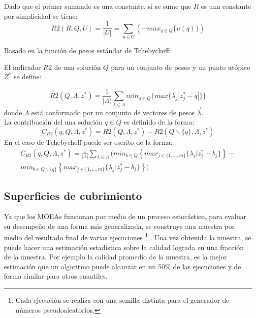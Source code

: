 Dado que el primer sumando es una constante, si se sume que $R$ es una constante por simplicidad se tiene:
\begin{equation}
R2(R, Q, U) = \frac{1}{|U|} = \sum_{u \in U} \left ( - max_{q \in Q}\{u(q)\} \right )
\end{equation}


Basado en la función de pesos estándar de Tchebycheff:
\begin{Classic}
El indicador $R2$ de una solución $Q$ para un conjunto de pesos y un punto utópico $Z^*$ se define:
\end{Classic}
\begin{equation}
R2(Q, \Lambda, z^*) = \frac{1}{|\Lambda|} \sum_{\lambda \in \Lambda} min_{q \in Q} \{ max \{ \lambda_j | z_j^* - q | \} \}
\end{equation}
donde $\Lambda$ está conformado por un conjunto de vectores de pesos $\vec{\lambda}$.\\
%
La contribución del una solución $q \in Q$ es definido de la forma:
\begin{equation}
C_{R2}(q, Q, \Lambda, z^*) = R2(Q, \Lambda, z^*) - R2(Q \backslash \{q\}, \Lambda, z^*)
\end{equation}
En el caso de Tchebycheff puede ser escrito de la forma:
\begin{equation}
\begin{split}
C_{R2}(q, Q, \Lambda, z^*) =  \frac{1}{|\Lambda|} \sum_{\lambda \in \Lambda} ( min_{b \in Q} \left \{ max_{j \in \{1,...,m\}} \{ \lambda_j | z_j^* - b_j\} \right \} -
	\\   min_{b \in Q \backslash\{q\} } \left \{ max_{j \in \{1,...,m\}} \{ \lambda_j | z_j^* - b_j\} \right \}  )  
\end{split}
\end{equation}

\subsection{Superficies de cubrimiento}

Ya que los MOEAs funcionan por medio de un proceso estocástico, para evaluar su desempeño de una forma más generalizada, se construye una muestra por medio del resultado final de varias ejecuciones \footnote{Cada ejecución se realiza con una semilla distinta para el generador de números pseudoaleatorios.} \citep{Joel:ComparisonStochasticSurfaces}.
%
Una vez obtenida la muestra, se puede hacer una estimación estadística sobre la calidad lograda en una fracción de la muestra.
%
Por ejemplo la calidad promedio de la muestra, es la mejor estimación que un algoritmo puede alcanzar en un 50\% de las ejecuciones y de forma similar para otros cuantiles.
%

